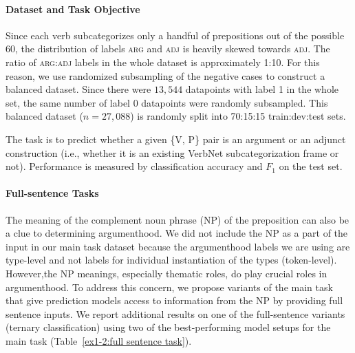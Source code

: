 \documentclass[letterpaper]{article} %
\begin{document}
\paragraph{Dataset and Task Objective}  Since each verb subcategorizes only a handful of prepositions out of the possible 60, the distribution of labels \textsc{arg} and \textsc{adj} is heavily skewed towards \textsc{adj}. The ratio of \textsc{arg}:\textsc{adj} labels in the whole dataset is approximately 1:10. For this reason, we use randomized subsampling of the negative cases to construct a balanced dataset. Since there were $13,544$ datapoints with label 1 in the whole set, the same number of label 0 datapoints were randomly subsampled. This balanced dataset ($n=27,088$) is randomly split into 70:15:15 train:dev:test sets.

The task is to predict whether a given \textsc{\{V, P\}} pair is an argument or an adjunct construction (i.e., whether it is an existing VerbNet subcategorization frame or not). Performance is measured by classification accuracy and $F_1$ on the test set.

\paragraph{Full-sentence Tasks} The meaning of the complement noun phrase (NP) of the preposition can also be a clue to determining argumenthood. We did not include the NP as a part of the input in our main task dataset because the argumenthood labels we are using are type-level and not labels for individual instantiation of the types (token-level). However,the NP meanings, especially thematic roles, do play crucial roles in argumenthood. To address this concern, we propose variants of the main task that give prediction models access to information from the NP by providing full sentence inputs. We report additional results on one of the full-sentence variants (ternary classification) using two of the best-performing model setups for the main task (Table~\ref{ex1-2:full sentence task}).
\end{document}
